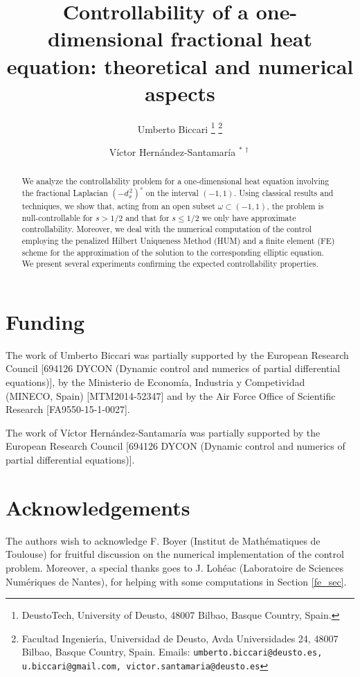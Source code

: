 \documentclass[preprint,10pt]{article}
\title{{\bf Controllability of a one-dimensional fractional heat equation: theoretical and numerical aspects}}
\author{Umberto Biccari \thanks{DeustoTech, University of Deusto, 48007 Bilbao, Basque Country, Spain.}\,\,\thanks{Facultad Ingenier\'{\i}a, Universidad de Deusto, Avda Universidades 24, 48007 Bilbao, Basque Country, Spain. Emails: \texttt{umberto.biccari@deusto.es, u.biccari@gmail.com, victor.santamaria@deusto.es}}
\and 
V\'ictor Hern\'andez-Santamar\'ia$\phantom{i}^{\ast\,\dag}$%
}
\date{}
\numberwithin{equation}{section}
\numberwithin{equation}{section}
\numberwithin{theorem}{section}
\numberwithin{remark}{section}
\numberwithin{lemma}{section}
\numberwithin{proposition}{section}
\numberwithin{definition}{section}
\newcommand{\fl}[2]{(-d_x^{\,2})^{#1}#2}
\begin{document}


\maketitle

\begin{abstract}
We analyze the controllability problem for a one-dimensional heat equation involving the fractional Laplacian $\fl{s}{}$ on the interval $(-1,1)$. Using classical results and techniques, we show that, acting from an open subset $\omega\subset(-1,1)$, the problem is null-controllable for $s>1/2$ and that for $s\leq 1/2$ we only have approximate controllability. Moreover, we deal with the numerical computation of the control employing the penalized Hilbert Uniqueness Method (HUM) and a finite element (FE) scheme for the approximation of the solution to the corresponding elliptic equation. We present several experiments confirming the expected controllability properties.
\end{abstract}








\section*{Funding}
The work of Umberto Biccari was partially supported by the European Research Council [694126 DYCON (Dynamic control and numerics of partial differential equations)], by the Ministerio de Econom\'ia, Industria y Competividad (MINECO, Spain) [MTM2014-52347] and by the Air Force Office of Scientific Research [FA9550-15-1-0027]. 

The work of V\'ictor Hern\'andez-Santamar\'ia was partially supported by the European Research Council [694126 DYCON (Dynamic control and numerics of partial differential equations)].
 

\section*{Acknowledgements}
The authors wish to acknowledge F. Boyer (Institut de Math\'ematiques de Toulouse) for fruitful discussion on the numerical implementation of the control problem. Moreover, a special thanks goes to J. Loh\'eac (Laboratoire de Sciences Num\'eriques de Nantes), for helping with some computations in Section \ref{fe_sec}.  


\end{document}
